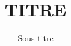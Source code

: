\documentclass[12pt]{article}
\begin{document}
 
 
 
\title{TITRE}%
\author{Sous-titre} 
\maketitle
\end{document}
